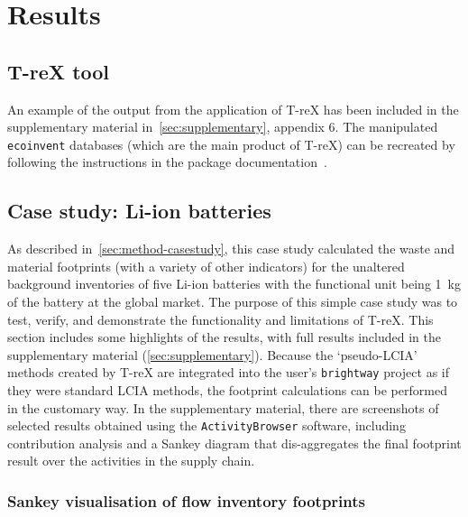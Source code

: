 \documentclass[a4paper,fleqn]{cas-dc}
\renewcommand{\texttt}[1]{{\ttfamily\small\nolinkurl{#1}}}
\begin{document}
\section{Results}\label{sec:results}
\subsection{T-reX tool}\label{sec:results-T-reX}

An example of the output from the application of T-reX has been included in the
supplementary material in~\autoref{sec:supplementary}, appendix 6. The
manipulated \texttt{ecoinvent} databases (which are the main product of T-reX)
can be recreated by following the instructions in the package
documentation~\citep{mcdowall2023T-reXdocs}.

\subsection{Case study: Li-ion batteries}\label{sec:results-casestudy}

As described in~\autoref{sec:method-casestudy}, this case study calculated the
waste and material footprints (with a variety of other indicators) for the
unaltered background inventories of five Li-ion batteries with the functional
unit being 1~kg of the battery at the global market. The purpose of this simple
case study was to test, verify, and demonstrate the functionality and
limitations of T-reX. This section includes some highlights of the results,
with full results included in the supplementary material
(\autoref{sec:supplementary}). Because the `pseudo-LCIA' methods created by
T-reX are integrated into the user's \texttt{brightway} project as if they were
standard LCIA methods, the footprint calculations can be performed in the
customary way. In the supplementary material, there are screenshots of selected
results obtained using the \texttt{ActivityBrowser} software, including
contribution analysis and a Sankey diagram that dis-aggregates the final
footprint result over the activities in the supply chain.

\subsubsection{Sankey visualisation of flow inventory footprints}\label{sec:results-case_study-sankey}
\end{document}
